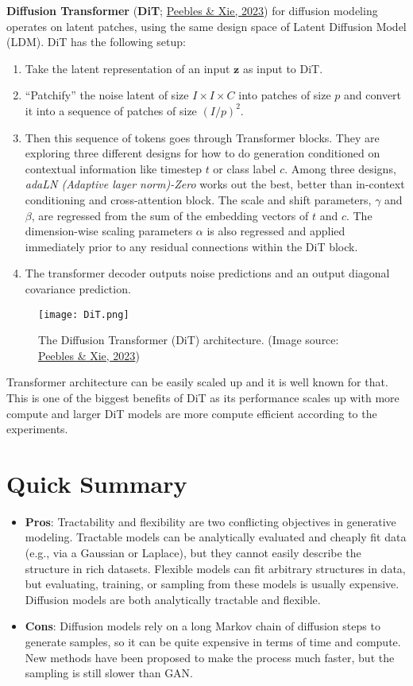 \documentclass[12pt]{article}
\begin{document}
\textbf{Diffusion Transformer} (\textbf{DiT}; \href{https://arxiv.org/abs/2212.09748}{Peebles \& Xie, 2023}) for diffusion modeling operates on latent patches, using the same design space of Latent Diffusion Model (LDM). DiT has the following setup:
\begin{enumerate}
    \item Take the latent representation of an input $\mathbf{z}$ as input to DiT.
    \item ``Patchify'' the noise latent of size $I \times I \times C$ into patches of size $p$ and convert it into a sequence of patches of size $(I/p)^2$.
    \item Then this sequence of tokens goes through Transformer blocks. They are exploring three different designs for how to do generation conditioned on contextual information like timestep $t$ or class label $c$. Among three designs, \emph{adaLN (Adaptive layer norm)-Zero} works out the best, better than in-context conditioning and cross-attention block. The scale and shift parameters, $\gamma$ and $\beta$, are regressed from the sum of the embedding vectors of $t$ and $c$. The dimension-wise scaling parameters $\alpha$ is also regressed and applied immediately prior to any residual connections within the DiT block.
    \item The transformer decoder outputs noise predictions and an output diagonal covariance prediction.
\end{enumerate}

\begin{figure}[H]
    \centering
    \texttt{[image: DiT.png]}
    \caption{The Diffusion Transformer (DiT) architecture. (Image source: \href{https://arxiv.org/abs/2212.09748}{Peebles \& Xie, 2023})}
\end{figure}

Transformer architecture can be easily scaled up and it is well known for that. This is one of the biggest benefits of DiT as its performance scales up with more compute and larger DiT models are more compute efficient according to the experiments.

\section{Quick Summary}
\begin{itemize}
    \item \textbf{Pros}: Tractability and flexibility are two conflicting objectives in generative modeling. Tractable models can be analytically evaluated and cheaply fit data (e.g., via a Gaussian or Laplace), but they cannot easily describe the structure in rich datasets. Flexible models can fit arbitrary structures in data, but evaluating, training, or sampling from these models is usually expensive. Diffusion models are both analytically tractable and flexible.
    \item \textbf{Cons}: Diffusion models rely on a long Markov chain of diffusion steps to generate samples, so it can be quite expensive in terms of time and compute. New methods have been proposed to make the process much faster, but the sampling is still slower than GAN.
\end{itemize}
\end{document}
